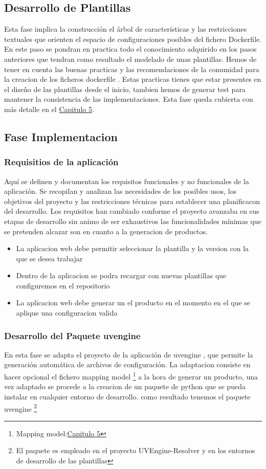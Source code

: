 \documentclass[12pt, a4paper, twoside]{article}
\begin{document}
\subsection{Desarrollo de Plantillas}
Esta fase implica la construcción el árbol de características y las restricciones textuales que orienten el espacio de 
configuraciones posibles del fichero Dockerfile. En este paso se pondran en practica todo el conocimiento adquirido en los pasos anteriores que 
tendran como resultado el modelado de unas plantillas. Hemos de tener en cuenta las buenas practicas y las recomendaciones de la comunidad para la creacion de los ficheros dockerfile \cite{dockerfile_concepts}. 
Estas practicas tienes que estar presentes en el diseño de las plantillas desde el inicio, tambien hemos de generar test para mantener la consistencia de las implementaciones. 
Esta fase queda cubierta con más detalle en el \hyperref[sec:Modelado de las plantillas]{Capitulo 5}.


\subsection{Fase Implementacion}
\subsubsection{Requisitios de la aplicación }
Aquí se definen y documentan los requisitos funcionales y no funcionales de la aplicación. Se recopilan y analizan las 
necesidades de los posibles usos, los objetivos del proyecto y las restricciones técnicas para establecer una planificacon del desarrollo. 
Los requisitos han cambiado conforme el proyecto avanzaba en sus etapas de desarrollo
sin animo de ser exhaustivos las funcionalidades mínimas que se pretenden alcazar son en cuanto a la generacion de productos.
\begin{itemize}
	\item La aplicacion web debe permitir seleccionar la plantilla y la version con la que se desea trabajar 
	\item Dentro de la aplicacion se podra recargar con nuevas plantillas que configuremos en el repositorio
	\item La aplicacion web debe generar un el producto en el momento en el que se aplique una configuracion valida 
\end{itemize}

\subsubsection{Desarrollo del Paquete uvengine }
En esta fase se adapta el proyecto de la aplicación de uvengine \cite{uvengine_github}, que permite la generación automática de archivos de configuración.
La adaptacion consiste en hacer opcional el fichero mapping model \footnote{Mapping model:\hyperref[sec:Mapping Model]{Capitulo 5}} a la hora de generar un producto, una vez adaptado se procede a la creacion de un paquete de python que se pueda instalar en cualquier entorno de desarrollo.
como resultado tenemos el paquete uvengine \cite{uvengine_pypi} \footnote{El paquete es empleado en el proyecto UVEngine-Resolver y en los entornos de desarrollo de las plantillas}
\end{document}
